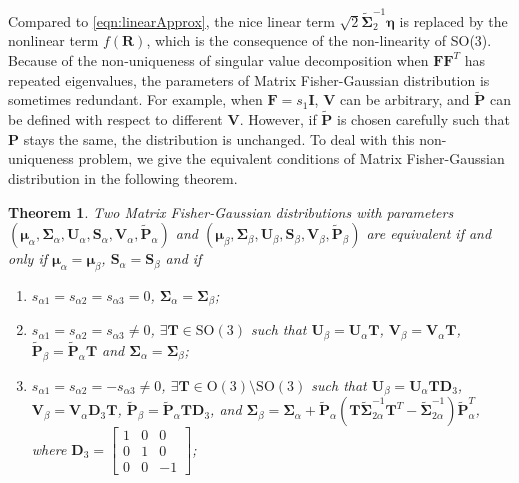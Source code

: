 \documentclass[12pt]{article}
\newtheorem{theorem}{Theorem}
\begin{document}
Compared to \eqref{eqn:linearApprox}, the nice linear term $\sqrt{2}\tilde{\mathbf{\Sigma}}_2^{-1}\bm{\eta}$ is replaced by the nonlinear term $f(\mathbf{R})$, which is the consequence of the non-linearity of SO(3).
Because of the non-uniqueness of singular value decomposition when $\mathbf{F}\mathbf{F}^T$ has repeated eigenvalues, the parameters of Matrix Fisher-Gaussian distribution is sometimes redundant.
For example, when $\mathbf{F} = s_1\mathbf{I}$, $\mathbf{V}$ can be arbitrary, and $\tilde{\mathbf{P}}$ can be defined with respect to different $\mathbf{V}$.
However, if $\tilde{\mathbf{P}}$ is chosen carefully such that $\mathbf{P}$ stays the same, the distribution is unchanged.
To deal with this non-uniqueness problem, we give the equivalent conditions of Matrix Fisher-Gaussian distribution in the following theorem.
\begin{theorem} \label{thm:Equivalence}
	Two Matrix Fisher-Gaussian distributions with parameters $(\bm{\mu}_\alpha, \mathbf{\Sigma}_\alpha, \mathbf{U}_\alpha, \mathbf{S}_\alpha, \mathbf{V}_\alpha, \mathbf{\tilde{P}}_\alpha)$ and $(\bm{\mu}_\beta, \mathbf{\Sigma}_\beta, \mathbf{U}_\beta, \mathbf{S}_\beta, \mathbf{V}_\beta, \mathbf{\tilde{P}}_\beta)$ are equivalent if and only if $\bm{\mu}_\alpha=\bm{\mu}_\beta$, $\mathbf{S}_\alpha=\mathbf{S}_\beta$ and if
	\begin{enumerate}
		\item $s_{\alpha 1}=s_{\alpha 2}=s_{\alpha 3}=0$, $\mathbf{\Sigma}_\alpha=\mathbf{\Sigma}_\beta$;
		\item $s_{\alpha 1}=s_{\alpha 2}=s_{\alpha 3}\neq 0$, $\exists\mathbf{T}\in\mathrm{SO}(3)$ such that $\mathbf{U}_\beta=\mathbf{U}_\alpha\mathbf{T}$, $\mathbf{V}_\beta=\mathbf{V}_\alpha\mathbf{T}$, $\tilde{\mathbf{P}}_\beta=\tilde{\mathbf{P}}_\alpha\mathbf{T}$ and $\mathbf{\Sigma}_\alpha=\mathbf{\Sigma}_\beta$;
		\item $s_{\alpha 1}=s_{\alpha 2}=-s_{\alpha 3}\neq 0$, $\exists\mathbf{T}\in\mathrm{O}(3)\setminus\mathrm{SO}(3)$ such that $\mathbf{U}_\beta=\mathbf{U}_\alpha\mathbf{T}\mathbf{D}_3$, $\mathbf{V}_\beta=\mathbf{V}_\alpha\mathbf{D}_3\mathbf{T}$, $\tilde{\mathbf{P}}_\beta=\tilde{\mathbf{P}}_\alpha\mathbf{T}\mathbf{D}_3$, and $\mathbf{\Sigma}_\beta=\mathbf{\Sigma}_\alpha+\tilde{\mathbf{P}}_\alpha\left(\mathbf{T}\tilde{\mathbf{\Sigma}}_{2\alpha}^{-1}\mathbf{T}^T-\tilde{\mathbf{\Sigma}}_{2\alpha}^{-1}\right)\tilde{\mathbf{P}}_\alpha^T$, where $\mathbf{D}_3=\begin{bmatrix}1&0&0\\0&1&0\\0&0&-1\end{bmatrix}$;

\end{enumerate}
\end{theorem}
\end{document}
